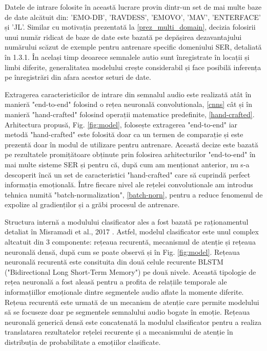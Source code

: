 \documentclass[a4paper,12pt]{book}
\begin{document}
					Datele de intrare folosite în această lucrare provin dintr-un set de mai multe baze de date alcătuit din: 'EMO-DB', 'RAVDESS', 'EMOVO', 'MAV', 'ENTERFACE' și 'JL'. Similar cu motivația prezentată la \ref{prez_multi_domain}, decizia folosirii unui număr ridicat de baze de date este bazată pe depășirea dezavantajului numărului scăzut de exemple pentru antrenare specific domeniului SER, detaliată în 1.3.1. În același timp deoarece semnalele autio sunt înregistrate în locații și limbi diferite, generalitatea modelului crește considerabil și face posibilă inferența pe înregistrări din afara acestor seturi de date. \par
					
					Extragerea caracteristicilor de intrare din semnalul audio este realizată atât în manieră "end-to-end" folosind o rețea neuronală convolutionala, \ref{cnns} cât și în manieră "hand-crafted" folosind operații matematice predefinite, \ref{hand-crafted}. Arhitectura propusă, Fig. \ref{fig:model}, folosește extragerea "end-to-end" iar metodă "hand-crafted" este folosită doar ca un termen de comparație și este prezentă doar în modul de utilizare pentru antrenare. Această decize este bazată pe rezultatele promițătoare obținute prin folosirea arhitecturilor "end-to-end"  în mai multe sisteme SER și pentru că, după cum am menționat anterior, nu s-a descoperit încă un set de caracteristici "hand-crafted" care să cuprindă perfect informația emoțională. Între fiecare nivel ale rețelei convolutionale am introdus tehnica numită "batch-normalization", \ref{batch-norn}, pentru a reduce fenomenul de expolize al gradienților și a grăbi procesul de antrenare. \par
					Structura internă a modulului clasificator ales a fost bazată pe raționamentul detaliat în Misramadi et al., 2017 \cite{misramadi}. Astfel, modelul clasificator este unul complex altcatuit din 3 componente: rețeaua recurentă, mecanismul de atenție și rețeaua neuronală densă, după cum se poate observă și în Fig. \ref{fig:model}.  
					Rețeaua neuronală recurentă este consituita din două celule recurente BLSTM ("Bidirectional Long Short-Term Memory") pe două nivele. Această tipologie de rețea neuronală a fost aleasă pentru a profita de relațiile temporale ale informațiillor emoționale dintre segmentele audio aflate la momente diferite. Rețeua recurentă este urmată de un mecanism de atenție care permite modelului să se focuseze doar pe segmentele semnalului audio bogate în emoție. Rețeaua neuronală generică densă este concatenată la modulul clasificator pentru a realiza translatarea rezultatelor rețelei recurente și a mecanismului de atenție în distribuția de probabilitate a emoțiilor clasificate.\par
					
\end{document}

